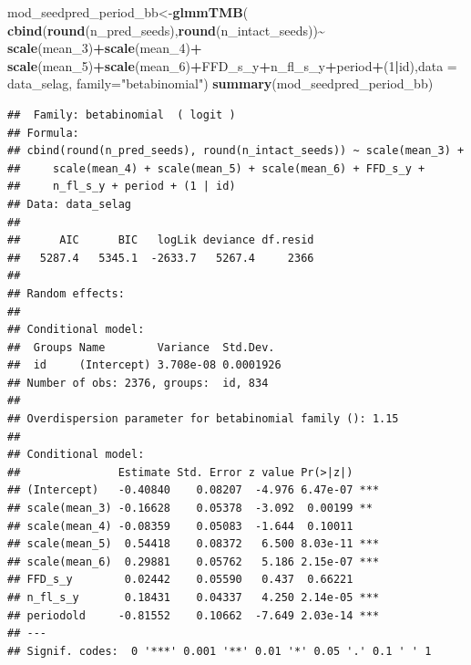 \documentclass[
]{article}
\newenvironment{Shaded}{\begin{snugshade}}{\end{snugshade}}
\newcommand{\DataTypeTok}[1]{\textcolor[rgb]{0.13,0.29,0.53}{#1}}
\newcommand{\DecValTok}[1]{\textcolor[rgb]{0.00,0.00,0.81}{#1}}
\newcommand{\KeywordTok}[1]{\textcolor[rgb]{0.13,0.29,0.53}{\textbf{#1}}}
\newcommand{\NormalTok}[1]{#1}
\newcommand{\OperatorTok}[1]{\textcolor[rgb]{0.81,0.36,0.00}{\textbf{#1}}}
\newcommand{\StringTok}[1]{\textcolor[rgb]{0.31,0.60,0.02}{#1}}
\begin{document}
\begin{Shaded}
\begin{Highlighting}[]
\NormalTok{mod\_seedpred\_period\_bb\textless{}{-}}\KeywordTok{glmmTMB}\NormalTok{(}
  \KeywordTok{cbind}\NormalTok{(}\KeywordTok{round}\NormalTok{(n\_pred\_seeds),}\KeywordTok{round}\NormalTok{(n\_intact\_seeds))}\OperatorTok{\textasciitilde{}}\StringTok{ }\KeywordTok{scale}\NormalTok{(mean\_}\DecValTok{3}\NormalTok{)}\OperatorTok{+}\KeywordTok{scale}\NormalTok{(mean\_}\DecValTok{4}\NormalTok{)}\OperatorTok{+}
\StringTok{    }\KeywordTok{scale}\NormalTok{(mean\_}\DecValTok{5}\NormalTok{)}\OperatorTok{+}\KeywordTok{scale}\NormalTok{(mean\_}\DecValTok{6}\NormalTok{)}\OperatorTok{+}\NormalTok{FFD\_s\_y}\OperatorTok{+}\NormalTok{n\_fl\_s\_y}\OperatorTok{+}\NormalTok{period}\OperatorTok{+}\NormalTok{(}\DecValTok{1}\OperatorTok{|}\NormalTok{id),}\DataTypeTok{data =}\NormalTok{ data\_selag,}
  \DataTypeTok{family=}\StringTok{"betabinomial"}\NormalTok{)}
\KeywordTok{summary}\NormalTok{(mod\_seedpred\_period\_bb)}
\end{Highlighting}
\end{Shaded}

\begin{verbatim}
##  Family: betabinomial  ( logit )
## Formula:          
## cbind(round(n_pred_seeds), round(n_intact_seeds)) ~ scale(mean_3) +  
##     scale(mean_4) + scale(mean_5) + scale(mean_6) + FFD_s_y +  
##     n_fl_s_y + period + (1 | id)
## Data: data_selag
## 
##      AIC      BIC   logLik deviance df.resid 
##   5287.4   5345.1  -2633.7   5267.4     2366 
## 
## Random effects:
## 
## Conditional model:
##  Groups Name        Variance  Std.Dev. 
##  id     (Intercept) 3.708e-08 0.0001926
## Number of obs: 2376, groups:  id, 834
## 
## Overdispersion parameter for betabinomial family (): 1.15 
## 
## Conditional model:
##               Estimate Std. Error z value Pr(>|z|)    
## (Intercept)   -0.40840    0.08207  -4.976 6.47e-07 ***
## scale(mean_3) -0.16628    0.05378  -3.092  0.00199 ** 
## scale(mean_4) -0.08359    0.05083  -1.644  0.10011    
## scale(mean_5)  0.54418    0.08372   6.500 8.03e-11 ***
## scale(mean_6)  0.29881    0.05762   5.186 2.15e-07 ***
## FFD_s_y        0.02442    0.05590   0.437  0.66221    
## n_fl_s_y       0.18431    0.04337   4.250 2.14e-05 ***
## periodold     -0.81552    0.10662  -7.649 2.03e-14 ***
## ---
## Signif. codes:  0 '***' 0.001 '**' 0.01 '*' 0.05 '.' 0.1 ' ' 1
\end{verbatim}
\end{document}
